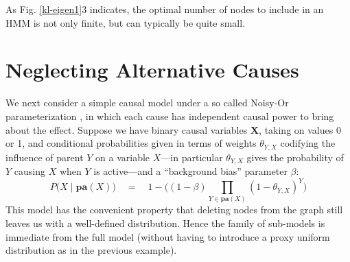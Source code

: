\documentclass[10pt,letterpaper]{article}
\begin{document}
As Fig. \ref{kl-eigen1}3 indicates, the optimal number of nodes to include in an HMM is not only finite, but can typically be quite small.

\section{Neglecting Alternative Causes}

We next consider a simple causal model under a so called Noisy-Or parameterization \citep{Cheng}, in which each cause has independent causal power to bring about the effect. Suppose we have binary causal variables $\textbf{X}$, taking on values 0 or 1, and conditional probabilities given in terms of weights $\theta_{Y,X}$ codifying the influence of parent $Y$ on a variable $X$---in particular $\theta_{Y,X}$ gives the probability of $Y$ causing $X$ when $Y$ is active---and a ``background bias'' parameter $\beta$: $$P\big(X\mid \textbf{pa}(X)\big) \quad = \quad 1-\Big((1-\beta)\prod_{Y \in \textbf{pa}(X)} (1-\theta_{Y,X})^Y\Big)$$
This model has the convenient property that deleting nodes from the graph still leaves us with a well-defined distribution. Hence the family of sub-models is immediate from the full model (without having to introduce a proxy uniform distribution as in the previous example).
\end{document}
